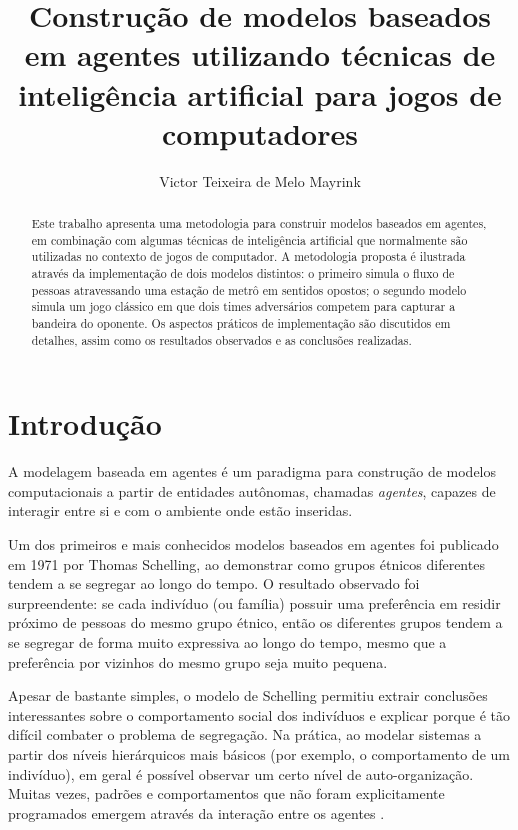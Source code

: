 \documentclass[preprint,12pt]{elsarticle}
\begin{document}
		
\title{Construção de modelos baseados em agentes utilizando técnicas de inteligência artificial para jogos de computadores}
\author{Victor Teixeira de Melo Mayrink}
\address{MAC5784 - Inteligência Artificial em Jogos de Computador}

\begin{abstract}
	Este trabalho apresenta uma metodologia para construir modelos baseados em agentes, em combinação com algumas técnicas de inteligência artificial que normalmente são utilizadas no contexto de jogos de computador. A metodologia proposta é ilustrada através da implementação de dois modelos distintos: o primeiro simula o fluxo de pessoas atravessando uma estação de metrô em sentidos opostos; o segundo modelo simula um jogo clássico em que dois times adversários competem para capturar a bandeira do oponente. Os aspectos práticos de implementação são discutidos em detalhes, assim como os resultados observados e as conclusões realizadas.
\end{abstract}

\maketitle

\section{Introdução}
\label{sec:intro}

A modelagem baseada em agentes é um paradigma para construção de modelos computacionais a partir de entidades autônomas, chamadas \textit{agentes}, capazes de interagir entre si e com o ambiente onde estão inseridas.

Um dos primeiros e mais conhecidos modelos baseados em agentes foi publicado em 1971 por Thomas Schelling, ao demonstrar como grupos étnicos diferentes tendem a se segregar ao longo do tempo. O resultado observado foi surpreendente: se cada indivíduo (ou família) possuir uma preferência em residir próximo de pessoas do mesmo grupo étnico, então os diferentes grupos tendem a se segregar de forma muito expressiva ao longo do tempo, mesmo que a preferência por vizinhos do mesmo grupo seja muito pequena.

Apesar de bastante simples, o modelo de Schelling permitiu extrair conclusões interessantes sobre o comportamento social dos indivíduos e explicar porque é tão difícil combater o problema de segregação. Na prática, ao modelar sistemas a partir dos níveis hierárquicos mais básicos (por exemplo, o comportamento de um indivíduo), em geral é possível observar um certo nível de auto-organização. Muitas vezes, padrões e comportamentos que não foram explicitamente programados emergem através da interação entre os agentes \cite{macal2010tutorial}.
\end{document}
